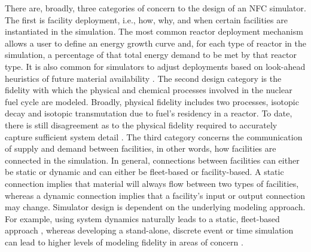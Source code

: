 There are, broadly, three categories of concern to the design of an NFC
simulator. The first is facility deployment, i.e., how, why, and when certain
facilities are instantiated in the simulation. The most common reactor
deployment mechanism allows a user to define an energy growth curve and, for
each type of reactor in the simulation, a percentage of that total energy demand
to be met by that reactor type. It is also common for simulators to adjust
deployments based on look-ahead heuristics of future material availability
\cite{schweitzer_improved_2008, van_den_durpel_daness_2009}. The second design
category is the fidelity with which the physical and chemical processes involved
in the nuclear fuel cycle are modeled. Broadly, physical fidelity includes two
processes, isotopic decay and isotopic transmutation due to fuel's residency in
a reactor. To date, there is still disagreement as to the physical fidelity
required to accurately capture sufficient system detail \cite{guerin_impact_2009}. The
third category concerns the communication of supply and demand between
facilities, in other words, how facilities are connected in the simulation. In
general, connections between facilities can either be static or dynamic and can
either be fleet-based or facility-based. A static connection implies that
material will always flow between two types of facilities, whereas a dynamic
connection implies that a facility's input or output connection may
change. Simulator design is dependent on the underlying modeling approach. For
example, using system dynamics \cite{forrester1971counterintuitive} naturally
leads to a static, fleet-based approach \cite{busquim_e_silva_system_2008,
  durpel_daness_2003, yacout_vision_2006}, whereas developing a stand-alone,
discrete event or time simulation \cite{Law:1999:SMA:554952} can lead to higher
levels of modeling fidelity in areas of concern \cite{schneider_nfcsim:_2005,
  mouginot2012class, boucher_cosi:_2006}.

